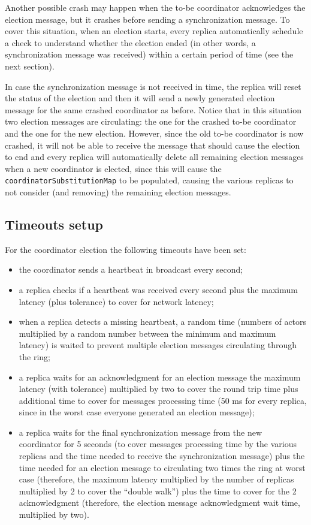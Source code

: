 Another possible crash may happen when the to-be coordinator acknowledges the election message, but it crashes before sending a synchronization message. To cover this situation, when an election starts, every replica automatically schedule a check to understand whether the election ended (in other words, a synchronization message was received) within a certain period of time (see the next section).

In case the synchronization message is not received in time, the replica will reset the status of the election and then it will send a newly generated election message for the same crashed coordinator as before. Notice that in this situation two election messages are circulating: the one for the crashed to-be coordinator and the one for the new election. However, since the old to-be coordinator is now crashed, it will not be able to receive the message that should cause the election to end and every replica will automatically delete all remaining election messages when a new coordinator is elected, since this will cause the \texttt{coordinatorSubstitutionMap} to be populated, causing the various replicas to not consider (and removing) the remaining election messages.

\subsection{Timeouts setup}

For the coordinator election the following timeouts have been set:

\begin{itemize}
\item the coordinator sends a heartbeat in broadcast every second;

\item a replica checks if a heartbeat was received every second plus the maximum latency (plus tolerance) to cover for network latency;

\item when a replica detects a missing heartbeat, a random time (numbers of actors multiplied by a random number between the minimum and maximum latency) is waited to prevent multiple election messages circulating through the ring;

\item a replica waits for an acknowledgment for an election message the maximum latency (with tolerance) multiplied by two to cover the round trip time plus additional time to cover for messages processing time (50 ms for every replica, since in the worst case everyone generated an election message);

\item a replica waits for the final synchronization message from the new coordinator for 5 seconds (to cover messages processing time by the various replicas and the time needed to receive the synchronization message) plus the time needed for an election message to circulating two times the ring at worst case (therefore, the maximum latency multiplied by the number of replicas multiplied by 2 to cover the “double walk”) plus the time to cover for the 2 acknowledgment (therefore, the election message acknowledgment wait time, multiplied by two).
\end{itemize}
